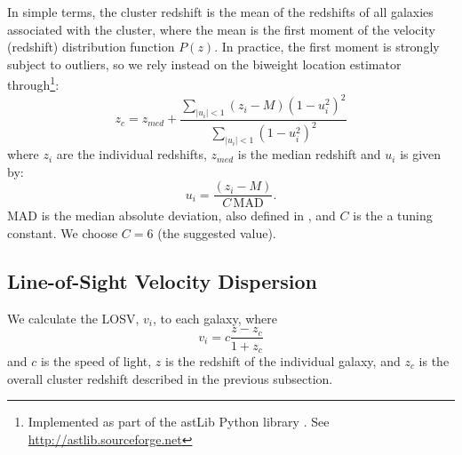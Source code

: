 \documentclass[fleqn,usenatbib]{mnras}
\begin{document}
In simple terms, the cluster redshift is the mean of the redshifts of all galaxies associated with the cluster, where the mean is the first moment of the velocity (redshift) distribution function $P(z)$. In practice, the first moment is strongly subject to outliers, so we rely instead on the biweight location estimator \citep{Beers1990} through\footnote{Implemented as part of the {\sc astLib} Python library \citep{astlib}. See \hbox{\url{http://astlib.sourceforge.net}}}:
\begin{equation}
z_c = z_{med} + \frac{\sum_{|u_i| < 1} (z_i - M)(1-u_i^2)^2}{\sum_{|u_i| < 1}(1-u_i^2)^2}
\end{equation}
where $z_i$ are the individual redshifts, $z_{med}$ is the median redshift and $u_i$ is given by:
\begin{equation}
	u_i = \frac{(z_i - M)}{C\,\mathrm{MAD}}.
\end{equation}
MAD is the median absolute deviation, also defined in \cite{Beers1990}, and $C$ is the a tuning constant. We choose $C=6$ (the \citealt{Beers1990} suggested value). 

\subsection{Line-of-Sight Velocity Dispersion}\label{sec: LOSVD}
We calculate the LOSV, $v_i$, to each galaxy, where
\begin{equation}
	v_i = c\frac{z - z_c}{1+z_c}
\end{equation}
and $c$ is the speed of light, $z$ is the redshift of the individual galaxy, and $z_c$ is the overall cluster redshift described in the previous subsection.
\end{document}
